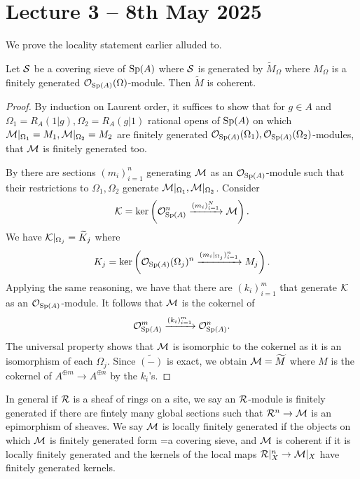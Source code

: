 \section{Lecture 3 -- 8th May 2025}\label{sec: lecture 3}
We prove the locality statement earlier alluded to. 
\begin{proposition}\label{prop: coherent module is local}
    Let $\mathcal{S}$ be a covering sieve of $\mathrm{Sp}(A)$ where $\mathcal{S}$ is generated by $\widetilde{M}_{\Omega}$ where $M_{\Omega}$ is a finitely generated $\mathcal{O}_{\mathrm{Sp}(A)}(\Omega)$-module. Then $\widetilde{M}$ is coherent. 
\end{proposition}
\begin{proof}
    By induction on Laurent order, it suffices to show that for $g\in A$ and $\Omega_{1}=R_{A}(1|g),\Omega_{2}=R_{A}(g|1)$ rational opens of $\mathrm{Sp}(A)$ on which $\mathcal{M}|_{\Omega_{1}}=M_{1},\mathcal{M}|_{\Omega_{2}}=M_{2}$ are finitely generated $\mathcal{O}_{\mathrm{Sp}(A)}(\Omega_{1}),\mathcal{O}_{\mathrm{Sp}(A)}(\Omega_{2})$-modules, that $\mathcal{M}$ is finitely generated too. 

    By  there are sections $(m_{i})_{i=1}^{n}$ generating $\mathcal{M}$ as an $\mathcal{O}_{\mathrm{Sp}(A)}$-module such that their restrictions to $\Omega_{1},\Omega_{2}$ generate $\mathcal{M}|_{\Omega_{1}},\mathcal{M}|_{\Omega_{2}}$. Consider 
    $$\mathcal{K}=\ker\left(\mathcal{O}_{\mathrm{Sp}(A)}^{n}\xrightarrow{(m_{i})_{i=1}^{N}}\mathcal{M}\right).$$
    We have $\mathcal{K}|_{\Omega_{j}}= \widetilde{K}_{j}$ where 
    $$K_{j}=\ker\left(\mathcal{O}_{\mathrm{Sp}(A)}(\Omega_{j})^{n}\xrightarrow{(m_{i}|_{\Omega_{j}})_{i=1}^{n}} M_{j}\right).$$
    Applying the same reasoning, we have that there are $(k_{i})_{i=1}^{m}$ that generate $\mathcal{K}$ as an $\mathcal{O}_{\mathrm{Sp}(A)}$-module. It follows that $\mathcal{M}$ is the cokernel of 
    $$\mathcal{O}_{\mathrm{Sp}(A)}^{m}\xrightarrow{(k_{i})_{i=1}^{m}}\mathcal{O}_{\mathrm{Sp}(A)}^{n}.$$
    The universal property shows that $\mathcal{M}$ is isomorphic to the cokernel as it is an isomorphism of each $\Omega_{j}$. Since $\widetilde{(-)}$ is exact, we obtain $\mathcal{M}=\widetilde{M}$ where $M$ is the cokernel of $A^{\oplus m}\to A^{\oplus n}$ by the $k_{i}$'s. 
\end{proof}
\begin{remark}\label{rmk: finitely generated modules over sites}
    In general if $\mathcal{R}$ is a sheaf of rings on a site, we say an $\mathcal{R}$-module is finitely generated if there are fintely many global sections such that $\mathcal{R}^{n}\to\mathcal{M}$ is an epimorphism of sheaves. We say $\mathcal{M}$ is locally finitely generated if the objects on which $\mathcal{M}$ is finitely generated form =a covering sieve, and $\mathcal{M}$ is coherent if it is locally finitely generated and the kernels of the local maps $\mathcal{R}|_{X}^{n}\to\mathcal{M}|_{X}$ have finitely generated kernels. 
\end{remark}
